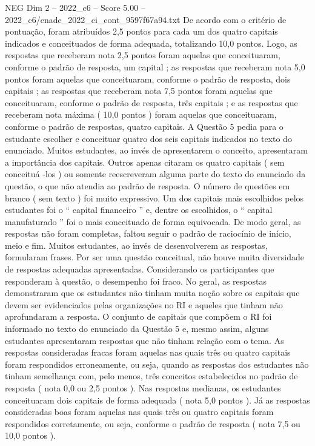 \begin{textsample}{NEG Dim 2 – 2022\_c6 – Score 5.00 – 2022\_c6/enade\_2022\_ci\_cont\_9597f67a94.txt}
De acordo com o critério de pontuação, foram atribuídos 2,5 pontos para cada um dos quatro capitais indicados e conceituados de forma adequada, totalizando 10,0 pontos.
Logo, as respostas que receberam nota 2,5 pontos foram aquelas que conceituaram, conforme o padrão de resposta, um capital ; as respostas que receberam nota 5,0 pontos foram aquelas que conceituaram, conforme o padrão de resposta, dois capitais ; as respostas que receberam nota 7,5 pontos foram aquelas que conceituaram, conforme o padrão de resposta, três capitais ; e as respostas que receberam nota máxima ( 10,0 pontos ) foram aquelas que conceituaram, conforme o padrão de respostas, quatro capitais.
A Questão 5 pedia para o estudante escolher e conceituar quatro dos seis capitais indicados no texto do enunciado.
Muitos estudantes, ao invés de apresentarem o conceito, apresentaram a importância dos capitais.
Outros apenas citaram os quatro capitais ( sem conceituá -los ) ou somente reescreveram alguma parte do texto do enunciado da questão, o que não atendia ao padrão de resposta.
O número de questões em branco ( sem texto ) foi muito expressivo.
Um dos capitais mais escolhidos pelos estudantes foi o “ capital financeiro ” e, dentre os escolhidos, o “ capital manufaturado ” foi o mais conceituado de forma equivocada.
De modo geral, as respostas não foram completas, faltou seguir o padrão de raciocínio de início, meio e fim.
Muitos estudantes, ao invés de desenvolverem as respostas, formularam frases.
Por ser uma questão conceitual, não houve muita diversidade de respostas adequadas apresentadas.
Considerando os participantes que responderam à questão, o desempenho foi fraco.
No geral, as respostas demonstraram que os estudantes não tinham muita noção sobre os capitais que devem ser evidenciados pelas organizações no RI e aqueles que tinham não aprofundaram a resposta.
O conjunto de capitais que compõem o RI foi informado no texto do enunciado da Questão 5 e, mesmo assim, alguns estudantes apresentaram respostas que não tinham relação com o tema.
As respostas consideradas fracas foram aquelas nas quais três ou quatro capitais foram respondidos erroneamente, ou seja, quando as respostas dos estudantes não tinham semelhança com, pelo menos, três conceitos estabelecidos no padrão de resposta ( nota 0,0 ou 2,5 pontos ).
Nas respostas medianas, os estudantes conceituaram dois capitais de forma adequada ( nota 5,0 pontos ).
Já as respostas consideradas boas foram aquelas nas quais três ou quatro capitais foram respondidos corretamente, ou seja, conforme o padrão de resposta ( nota 7,5 ou 10,0 pontos ).

\end{textsample}
